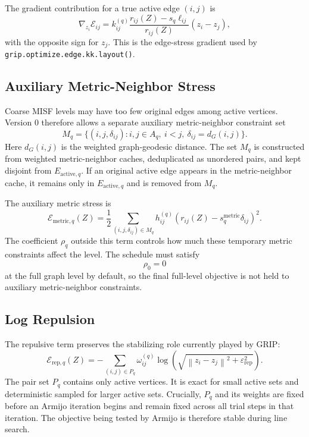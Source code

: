 \documentclass[11pt]{article}
\newcommand{\Rfunc}[1]{\texttt{#1}}
\newcommand{\norm}[1]{\left\lVert #1 \right\rVert}
\newcommand{\eps}{\varepsilon}
\begin{document}
The gradient contribution for a true active edge \((i,j)\) is
\[
  \nabla_{z_i}
  \mathcal{E}_{ij}
  =
  k_{ij}^{(q)}
  \frac{r_{ij}(Z)-s_q\ell_{ij}}{r_{ij}(Z)}
  (z_i-z_j),
\]
with the opposite sign for \(z_j\). This is the edge-stress gradient used by
\Rfunc{grip.optimize.edge.kk.layout()}.

\subsection{Auxiliary Metric-Neighbor Stress}

Coarse MISF levels may have too few original edges among active vertices.
Version 0 therefore allows a separate auxiliary metric-neighbor constraint set
\[
  M_q
  =
  \{(i,j,\delta_{ij}) : i,j\in A_q,\ i<j,\ \delta_{ij}=d_G(i,j)\}.
\]
Here \(d_G(i,j)\) is the weighted graph-geodesic distance. The set \(M_q\) is
constructed from weighted metric-neighbor caches, deduplicated as unordered
pairs, and kept disjoint from \(E_{\mathrm{active},q}\). If an original active
edge appears in the metric-neighbor cache, it remains only in
\(E_{\mathrm{active},q}\) and is removed from \(M_q\).

The auxiliary metric stress is
\[
  \mathcal{E}_{\mathrm{metric},q}(Z)
  =
  \frac{1}{2}
  \sum_{(i,j,\delta_{ij})\in M_q}
  h_{ij}^{(q)}
  \left(
    r_{ij}(Z) - s_q^{\mathrm{metric}}\delta_{ij}
  \right)^2.
\]
The coefficient \(\rho_q\) outside this term controls how much these temporary
metric constraints affect the level. The schedule must satisfy
\[
  \rho_0 = 0
\]
at the full graph level by default, so the final full-level objective is not
held to auxiliary metric-neighbor constraints.

\subsection{Log Repulsion}

The repulsive term preserves the stabilizing role currently played by GRIP:
\[
  \mathcal{E}_{\mathrm{rep},q}(Z)
  =
  -
  \sum_{(i,j)\in P_q}
  \omega_{ij}^{(q)}
  \log\left(
    \sqrt{\norm{z_i-z_j}^2+\eps_{\mathrm{rep}}^2}
  \right).
\]
The pair set \(P_q\) contains only active vertices. It is exact for small active
sets and deterministic sampled for larger active sets. Crucially, \(P_q\) and
its weights are fixed before an Armijo iteration begins and remain fixed across
all trial steps in that iteration. The objective being tested by Armijo is
therefore stable during line search.
\end{document}
